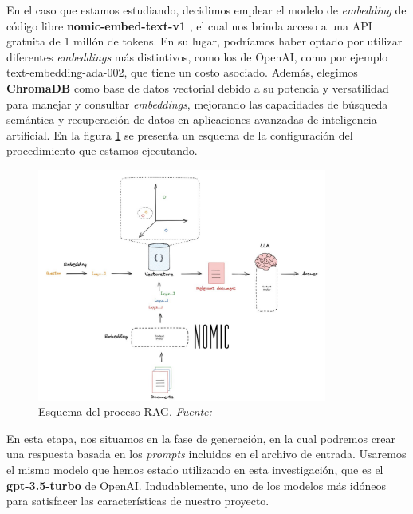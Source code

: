 \bigskip %

En el caso que estamos estudiando, decidimos emplear el modelo de \textit{embedding} de código libre \textbf{nomic-embed-text-v1} \cite{Nomic}, el cual nos brinda acceso a una \acrshort{API} gratuita de 1 millón de tokens. En su lugar, podríamos haber optado por utilizar diferentes \textit{embeddings} más distintivos, como los de OpenAI, como por ejemplo text-embedding-ada-002, que tiene un costo asociado. Además, elegimos \textbf{ChromaDB} \cite{Chroma} como base de datos vectorial debido a su potencia y versatilidad para manejar y consultar \textit{embeddings}, mejorando las capacidades de búsqueda semántica y recuperación de datos en aplicaciones avanzadas de inteligencia artificial. En la figura \ref{fig:5_RAG_Esquema} se presenta un esquema de la configuración del procedimiento que estamos ejecutando.

\bigskip %

\begin{figure}[htbp!]
  \centering
  \includegraphics[width=0.85\textwidth,keepaspectratio]{imaxes/5_RAG_Esquema.jpeg}
  \caption[Esquema del proceso RAG]{Esquema del proceso RAG. \textit{Fuente: \cite{LangChainAI2023}}}
  \label{fig:5_RAG_Esquema}
\end{figure}


\bigskip %

En esta etapa, nos situamos en la fase de generación, en la cual podremos crear una respuesta basada en los \textit{prompts} incluidos en el archivo de entrada. Usaremos el mismo modelo que hemos estado utilizando en esta investigación, que es el \textbf{gpt-3.5-turbo} de OpenAI. Indudablemente, uno de los modelos más idóneos para satisfacer las características de nuestro proyecto.


